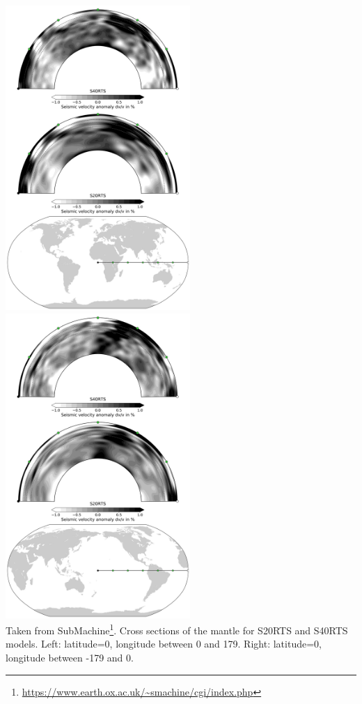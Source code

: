 \begin{center}
\includegraphics[width=7cm]{python_codes/fieldstone_71/images/sub_cross_section_01}
\includegraphics[width=7cm]{python_codes/fieldstone_71/images/sub_cross_section_02}\\
{\captionfont Taken from SubMachine\footnote{\url{https://www.earth.ox.ac.uk/~smachine/cgi/index.php}}.
Cross sections of the mantle for S20RTS and S40RTS models. 
Left: latitude=0, longitude between 0 and 179.
Right: latitude=0, longitude between -179 and 0.}
\end{center}

